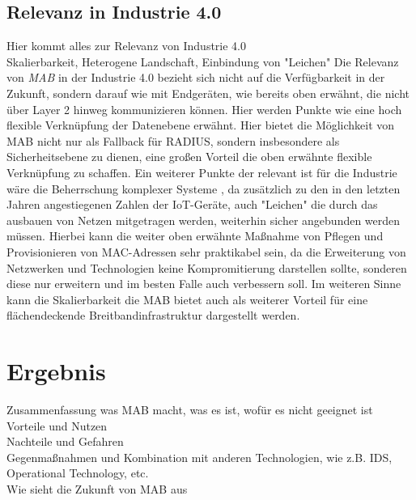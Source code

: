 \documentclass[conference]{IEEEtran}
\begin{document}
\subsection{Relevanz in Industrie 4.0}
Hier kommt alles zur Relevanz von Industrie 4.0\\
Skalierbarkeit, Heterogene Landschaft, Einbindung von "Leichen"
Die Relevanz von \emph{MAB} in der Industrie 4.0 bezieht sich nicht auf die Verfügbarkeit in der Zukunft, sondern darauf wie mit Endgeräten, wie bereits oben erwähnt, die nicht über Layer 2 hinweg kommunizieren können. Hier werden Punkte wie  eine hoch flexible Verknüpfung der Datenebene \cite{hirsch2014wandel} erwähnt. Hier bietet die Möglichkeit von MAB nicht nur als Fallback für RADIUS, sondern insbesondere als Sicherheitsebene zu dienen, eine großen Vorteil die oben erwähnte flexible Verknüpfung zu schaffen. Ein weiterer Punkte der relevant ist für die Industrie wäre die Beherrschung komplexer Systeme \cite{botthof2015zukunft}, da zusätzlich zu den in den letzten Jahren angestiegenen Zahlen der IoT-Geräte, auch "Leichen" die durch das ausbauen von Netzen mitgetragen werden, weiterhin sicher angebunden werden müssen. Hierbei kann die weiter oben erwähnte Maßnahme von Pflegen und Provisionieren von MAC-Adressen sehr praktikabel sein, da die Erweiterung von Netzwerken und Technologien keine Kompromitierung darstellen sollte, sonderen diese nur erweitern und im besten Falle auch verbessern soll. Im weiteren Sinne kann die Skalierbarkeit die MAB bietet auch als weiterer Vorteil für eine flächendeckende Breitbandinfrastruktur \cite{botthof2015zukunft} dargestellt werden. 


%

\section{Ergebnis}
Zusammenfassung was MAB macht, was es ist, wofür es nicht geeignet ist\\
Vorteile und Nutzen\\
Nachteile und Gefahren\\
Gegenmaßnahmen und Kombination mit anderen Technologien, wie z.B. IDS, Operational Technology, etc.\\

Wie sieht die Zukunft von MAB aus

%



\end{document}
